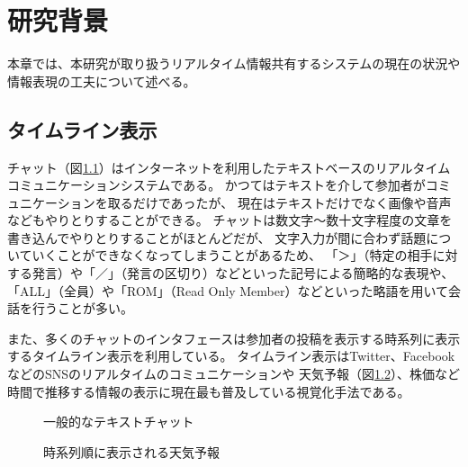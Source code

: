 \chapter{研究背景}
\label{chap:background}

本章では、本研究が取り扱うリアルタイム情報共有するシステムの現在の状況や情報表現の工夫について述べる。

\newpage

\section{タイムライン表示}

チャット（図\ref{chat}）はインターネットを利用したテキストベースのリアルタイムコミュニケーションシステムである。
かつてはテキストを介して参加者がコミュニケーションを取るだけであったが、
現在はテキストだけでなく画像や音声などもやりとりすることができる。
チャットは数文字〜数十文字程度の文章を書き込んでやりとりすることがほとんどだが、
文字入力が間に合わず話題についていくことができなくなってしまうことがあるため、
「＞」（特定の相手に対する発言）や「／」（発言の区切り）などといった記号による簡略的な表現や、
「ALL」（全員）や「ROM」（Read Only Member）などといった略語を用いて会話を行うことが多い。

また、多くのチャットのインタフェースは参加者の投稿を表示する時系列に表示するタイムライン表示を利用している。
タイムライン表示はTwitter、FacebookなどのSNSのリアルタイムのコミュニケーションや
天気予報（図\ref{weather}）、株価など時間で推移する情報の表示に現在最も普及している視覚化手法である。

\begin{figure}[H]
\centering
{}
\caption{一般的なテキストチャット}
\label{chat}
\end{figure}

\begin{figure}[H]
\centering
{}
\caption{時系列順に表示される天気予報}
\label{weather}
\end{figure}

